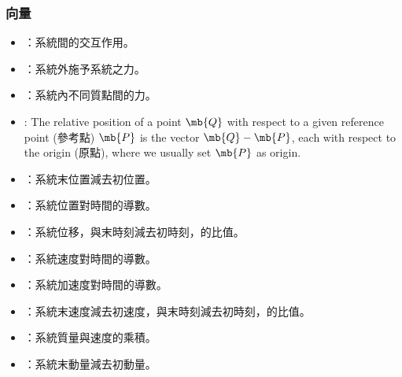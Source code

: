 \documentclass[a4paper,12pt]{article}
\begin{document}
\subsubsection{向量}
\begin{itemize}
\item{}：系統間的交互作用。
\item{}：系統外施予系統之力。
\item{}：系統內不同質點間的力。
\item{}: The relative position of a point $\mb{Q}$ with respect to a given reference point (參考點) $\mb{P}$ is the vector $\mb{Q}-\mb{P}$, each with respect to the origin (原點), where we usually set $\mb{P}$ as origin.
\item{}：系統末位置減去初位置。
\item{}：系統位置對時間的導數。
\item{}：系統位移，與末時刻減去初時刻，的比值。
\item{}：系統速度對時間的導數。
\item{}：系統加速度對時間的導數。
\item{}：系統末速度減去初速度，與末時刻減去初時刻，的比值。
\item{}：系統質量與速度的乘積。
\item{}：系統末動量減去初動量。
\end{itemize}
\end{document}
